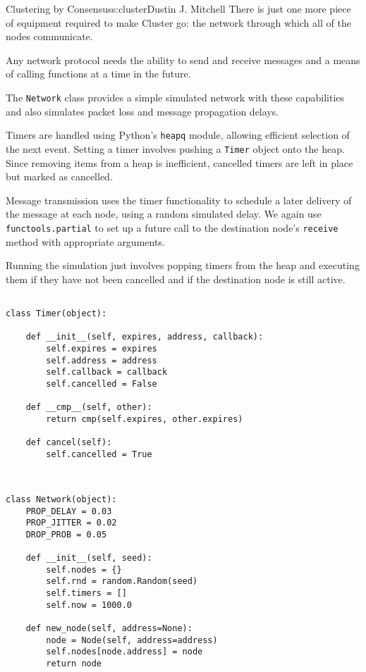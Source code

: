 \begin{aosachapter}{Clustering by Consensus}{s:cluster}{Dustin J. Mitchell}
There is just one more piece of equipment required to make Cluster go:
the network through which all of the nodes communicate.

\label{network}

Any network protocol needs the ability to send and receive messages and
a means of calling functions at a time in the future.

The \texttt{Network} class provides a simple simulated network with
these capabilities and also simulates packet loss and message
propagation delays.

Timers are handled using Python's \texttt{heapq} module, allowing
efficient selection of the next event. Setting a timer involves pushing
a \texttt{Timer} object onto the heap. Since removing items from a heap
is inefficient, cancelled timers are left in place but marked as
cancelled.

Message transmission uses the timer functionality to schedule a later
delivery of the message at each node, using a random simulated delay. We
again use \texttt{functools.partial} to set up a future call to the
destination node's \texttt{receive} method with appropriate arguments.

Running the simulation just involves popping timers from the heap and
executing them if they have not been cancelled and if the destination
node is still active.

\begin{verbatim}

class Timer(object):

    def __init__(self, expires, address, callback):
        self.expires = expires
        self.address = address
        self.callback = callback
        self.cancelled = False

    def __cmp__(self, other):
        return cmp(self.expires, other.expires)

    def cancel(self):
        self.cancelled = True
    
\end{verbatim}

\begin{verbatim}

class Network(object):
    PROP_DELAY = 0.03
    PROP_JITTER = 0.02
    DROP_PROB = 0.05

    def __init__(self, seed):
        self.nodes = {}
        self.rnd = random.Random(seed)
        self.timers = []
        self.now = 1000.0

    def new_node(self, address=None):
        node = Node(self, address=address)
        self.nodes[node.address] = node
        return node


\end{verbatim}
\end{aosachapter}
